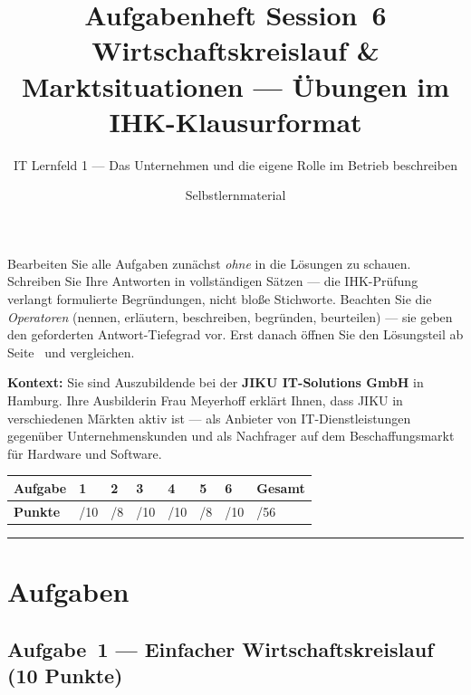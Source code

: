 \documentclass[11pt, a4paper]{article}
\title{\vspace*{-1.5cm}\Huge\bfseries\color{bfwPrimaryDark}Aufgabenheft Session~6\\[0.4em]
  \large\color{bfwInkSoft}\textnormal{Wirtschaftskreislauf \& Marktsituationen --- Übungen im IHK-Klausurformat}}
\author{\textsf{IT Lernfeld 1 --- Das Unternehmen und die eigene Rolle im Betrieb beschreiben}}
\date{Selbstlernmaterial}
\begin{document}
\maketitle
\thispagestyle{empty}

\begin{merksatz}[title={\bfseries So nutzen Sie dieses Aufgabenheft}]
Bearbeiten Sie alle Aufgaben zunächst \emph{ohne} in die Lösungen zu schauen. Schreiben
Sie Ihre Antworten in vollständigen Sätzen --- die IHK-Prüfung verlangt formulierte
Begründungen, nicht bloße Stichworte. Beachten Sie die \emph{Operatoren} (nennen,
erläutern, beschreiben, begründen, beurteilen) --- sie geben den geforderten
Antwort-Tiefegrad vor. Erst danach öffnen Sie den Lösungsteil ab Seite~\pageref{loesungen}
und vergleichen.
\end{merksatz}

\bigskip

\textbf{Kontext:} Sie sind Auszubildende bei der \textbf{JIKU IT-Solutions GmbH} in Hamburg.
Ihre Ausbilderin Frau Meyerhoff erklärt Ihnen, dass JIKU in verschiedenen Märkten aktiv ist
--- als Anbieter von IT-Dienstleistungen gegenüber Unternehmenskunden und als Nachfrager
auf dem Beschaffungsmarkt für Hardware und Software.

\bigskip

\noindent
\begin{tabular}{|l|l|l|l|l|l|l|l|}
\hline
\textbf{Aufgabe} & 1 & 2 & 3 & 4 & 5 & 6 & \textbf{Gesamt}\\
\hline
\textbf{Punkte} & /10 & /8 & /10 & /10 & /8 & /10 & /56\\
\hline
\end{tabular}

\tableofcontents
\vspace{1em}
\hrule

\section{Aufgaben}

\subsection*{Aufgabe~1 --- Einfacher Wirtschaftskreislauf (10 Punkte)}
\end{document}
